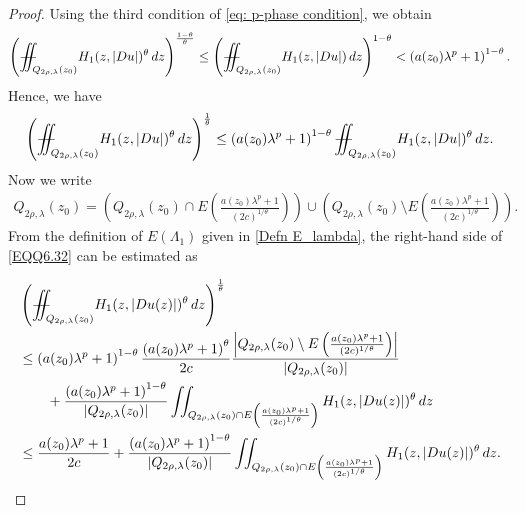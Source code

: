 \documentclass[11pt,oneside, english,reqno,twoside a4paper]{amsart}
\theoremstyle{definition}
\numberwithin{theorem}{section}
\numberwithin{equation}{section}
\newcommand{\la}{\lambda}
\newcommand{\iintss}{{\int\hspace{-0.28cm}\int}}
\newcommand{ \miints }{{\iintss\hspace{-0.56cm} -\hspace{-0.15cm}-}}
\newcommand{\miint}[1]{{\miints_{\hspace{-0.13cm}#1}}}
\begin{document}
\begin{proof}
Using the third condition of \eqref{eq: p-phase condition}, we obtain
\begin{align*}
    \left(\miint{Q_{2\rho, \lambda}(z_0)}H_1(z, |D u|)^{\theta}\, dz\right)^{\frac{1-\theta}{\theta}} \leq \left(\miint{Q_{2\rho, \lambda}(z_0)}H_1(z, |D u|)\, dz\right)^{1-\theta}<\left(a(z_0)\la^p+1\right)^{1-\theta}.
\end{align*}
Hence, we have
\begin{align}\label{EQQ6.32}
 \left(\miint{Q_{2\rho, \lambda}(z_0)}H_1(z, |D u|)^{\theta}\,dz\right)^{\frac{1}{\theta}}\leq \left(a(z_0)\la^p+1\right)^{1-\theta}\miint{Q_{2\rho, \lambda}(z_0)}H_1(z, |Du|)^{\theta}\,dz.    
\end{align}
Now we write
\begin{align*}
Q_{2\rho, \lambda}(z_0)= \left(Q_{2\rho, \lambda}(z_0) \cap E\left({\frac{a(z_0)\lambda^p+1}{(2c)^{1/\theta}}}\right)\right) \cup \left(Q_{2\rho, \lambda}(z_0) \setminus E\left({\frac{a(z_0)\lambda^p+1}{(2c)^{1/\theta}}}\right)\right).
\end{align*}
From the definition of $E(\Lambda_1)$ given in \eqref{Defn E_lambda}, the right-hand side of \eqref{EQQ6.32} can be estimated as

\begin{align}\label{EQUATION8.11}
 &\left(\miint{Q_{2\rho, \lambda}(z_0)}H_1(z, |D u(z)|)^{\theta}\,dz\right)^{\frac{1}{\theta}}\nonumber\\
 &\leq\left(a(z_0)\lambda^p+1\right)^{1-\theta}\frac{\left(a(z_0)\lambda^p+1\right)^{\theta}}{2c}\frac{\left|Q_{2\rho, \lambda}(z_0) \setminus E\left({\frac{a(z_0)\lambda^p+1}{(2c)^{1/\theta}}}\right)\right|}{\left|Q_{2\rho, \lambda}(z_0)\right|}\nonumber\\
 &\qquad + \frac{\left(a(z_0)\lambda^p+1\right)^{1-\theta}}{\left|Q_{2\rho, \lambda}(z_0)\right|}\iint_{Q_{2\rho, \lambda}(z_0) \cap E\left({\frac{a(z_0)\lambda^p+1}{(2c)^{1/\theta}}}\right)} H_1(z, |D u(z)|)^\theta\, dz\nonumber\\
 &\leq \frac{a(z_0)\lambda^p+1}{2c} + \frac{\left(a(z_0)\lambda^p+1\right)^{1-\theta}}{\left|Q_{2\rho, \lambda}(z_0)\right|}\iint_{Q_{2\rho, \lambda}(z_0) \cap E\left({\frac{a(z_0)\lambda^p+1}{(2c)^{1/\theta}}}\right)} H_1(z, |D u(z)|)^\theta\, dz.
\end{align}


\end{proof}
\end{document}
